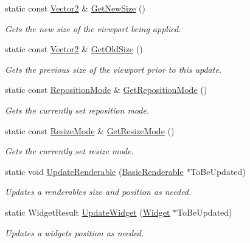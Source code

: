 \begin{DoxyCompactItemize}
static const \hyperlink{classMezzanine_1_1Vector2}{Vector2} \& \hyperlink{classMezzanine_1_1UI_1_1ViewportUpdateTool_a2f1524ae0e1a16d8e990be812aebfe3a}{GetNewSize} ()
\begin{DoxyCompactList}\small\item\em Gets the new size of the viewport being applied. \item\end{DoxyCompactList}\item 
static const \hyperlink{classMezzanine_1_1Vector2}{Vector2} \& \hyperlink{classMezzanine_1_1UI_1_1ViewportUpdateTool_a52e8cfef8e1e4054a7b281c2b42df50e}{GetOldSize} ()
\begin{DoxyCompactList}\small\item\em Gets the previous size of the viewport prior to this update. \item\end{DoxyCompactList}\item 
static const \hyperlink{classMezzanine_1_1UI_1_1ViewportUpdateTool_ad2de82a6fc57859d914845ce676ff67e}{RepositionMode} \& \hyperlink{classMezzanine_1_1UI_1_1ViewportUpdateTool_a6a1dffe6f6ba85063ad34279d6ba5700}{GetRepositionMode} ()
\begin{DoxyCompactList}\small\item\em Gets the currently set reposition mode. \item\end{DoxyCompactList}\item 
static const \hyperlink{classMezzanine_1_1UI_1_1ViewportUpdateTool_a89afdf79f52d5bf18bdffd323911a549}{ResizeMode} \& \hyperlink{classMezzanine_1_1UI_1_1ViewportUpdateTool_a4aca6a54d42ad2bf33b471376549bde2}{GetResizeMode} ()
\begin{DoxyCompactList}\small\item\em Gets the currently set resize mode. \item\end{DoxyCompactList}\item 
static void \hyperlink{classMezzanine_1_1UI_1_1ViewportUpdateTool_a6b070131c2a4174788246b95517a6528}{UpdateRenderable} (\hyperlink{classMezzanine_1_1UI_1_1BasicRenderable}{BasicRenderable} $\ast$ToBeUpdated)
\begin{DoxyCompactList}\small\item\em Updates a renderables size and position as needed. \item\end{DoxyCompactList}\item 
static WidgetResult \hyperlink{classMezzanine_1_1UI_1_1ViewportUpdateTool_af735913610e633fb127b08c146e7d16d}{UpdateWidget} (\hyperlink{classMezzanine_1_1UI_1_1Widget}{Widget} $\ast$ToBeUpdated)
\begin{DoxyCompactList}\small\item\em Updates a widgets position as needed. \item\end{DoxyCompactList}\end{DoxyCompactItemize}
